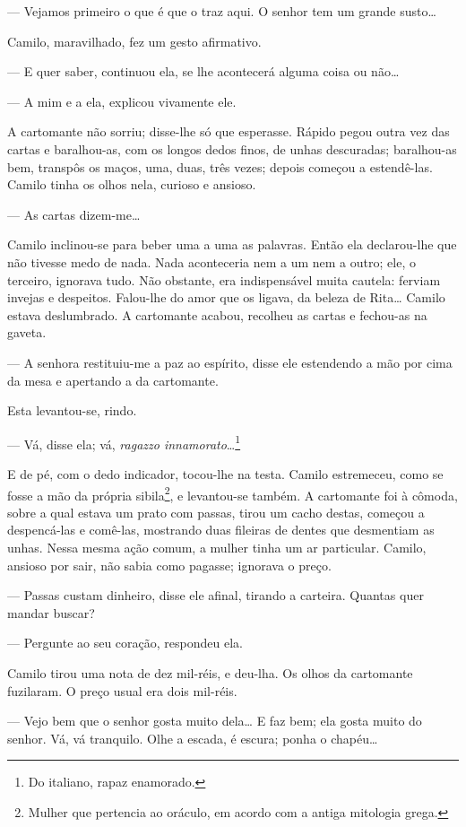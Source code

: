 --- Vejamos primeiro o que é que o traz aqui. O senhor tem um grande
susto\ldots{}

Camilo, maravilhado, fez um gesto afirmativo.

--- E quer saber, continuou ela, se lhe acontecerá alguma coisa ou
não\ldots{}

--- A mim e a ela, explicou vivamente ele.

A cartomante não sorriu; disse-lhe só que esperasse. Rápido pegou outra
vez das cartas e baralhou-as, com os longos dedos finos, de unhas
descuradas; baralhou-as bem, transpôs os maços, uma, duas, três vezes;
depois começou a estendê-las. Camilo tinha os olhos nela, curioso e
ansioso.

--- As cartas dizem-me\ldots{}

Camilo inclinou-se para beber uma a uma as palavras. Então ela
declarou-lhe que não tivesse medo de nada. Nada aconteceria nem a um nem
a outro; ele, o terceiro, ignorava tudo. Não obstante, era indispensável
muita cautela: ferviam invejas e despeitos. Falou-lhe do amor que os
ligava, da beleza de Rita\ldots{} Camilo estava deslumbrado. A
cartomante acabou, recolheu as cartas e fechou-as na gaveta.

--- A senhora restituiu-me a paz ao espírito, disse ele estendendo a mão
por cima da mesa e apertando a da cartomante.

Esta levantou-se, rindo.

--- Vá, disse ela; vá, \emph{ragazzo innamorato}\ldots{}\footnote{Do
  italiano, rapaz enamorado.}

E de pé, com o dedo indicador, tocou-lhe na testa. Camilo
estremeceu, como se fosse a mão da própria sibila\footnote{Mulher que
  pertencia ao oráculo, em acordo com a antiga mitologia grega.}, e
levantou-se também. A cartomante foi à cômoda, sobre a qual estava um
prato com passas, tirou um cacho destas, começou a despencá-las e
comê-las, mostrando duas fileiras de dentes que desmentiam as unhas.
Nessa mesma ação comum, a mulher tinha um ar particular. Camilo, ansioso
por sair, não sabia como pagasse; ignorava o preço.

--- Passas custam dinheiro, disse ele afinal, tirando a carteira. Quantas
quer mandar buscar?

--- Pergunte ao seu coração, respondeu ela.

Camilo tirou uma nota de dez mil-réis, e deu-lha. Os olhos da cartomante
fuzilaram. O preço usual era dois mil-réis.

--- Vejo bem que o senhor gosta muito dela\ldots{} E faz bem; ela gosta
muito do senhor. Vá, vá tranquilo. Olhe a escada, é escura; ponha o
chapéu\ldots{}

